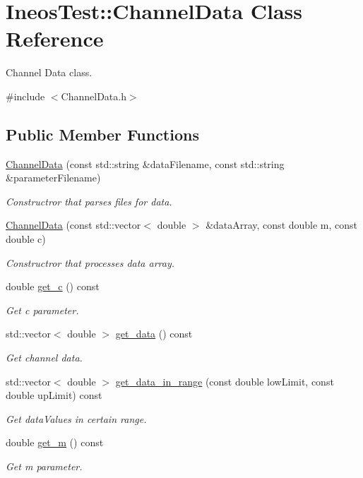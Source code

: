 \hypertarget{classIneosTest_1_1ChannelData}{\section{Ineos\-Test\-:\-:Channel\-Data Class Reference}
\label{classIneosTest_1_1ChannelData}
}


Channel Data class.  




{\ttfamily \#include $<$Channel\-Data.\-h$>$}

\subsection*{Public Member Functions}
\begin{DoxyCompactItemize}
\item 
\hyperlink{classIneosTest_1_1ChannelData_a78cbf79f506c2da567f22b37d22e6b26}{Channel\-Data} (const std\-::string \&data\-Filename, const std\-::string \&parameter\-Filename)
\begin{DoxyCompactList}\small\item\em Constructror that parses files for data. \end{DoxyCompactList}\item 
\hyperlink{classIneosTest_1_1ChannelData_a896dba77cb37e2208a67610bb2a828ba}{Channel\-Data} (const std\-::vector$<$ double $>$ \&data\-Array, const double m, const double c)
\begin{DoxyCompactList}\small\item\em Constructror that processes data array. \end{DoxyCompactList}\item 
double \hyperlink{classIneosTest_1_1ChannelData_a1345a162209296f0e9c299161dd0299c}{get\-\_\-c} () const 
\begin{DoxyCompactList}\small\item\em Get c parameter. \end{DoxyCompactList}\item 
std\-::vector$<$ double $>$ \hyperlink{classIneosTest_1_1ChannelData_a43434563ddf5e8b460bb1ffaa1716167}{get\-\_\-data} () const 
\begin{DoxyCompactList}\small\item\em Get channel data. \end{DoxyCompactList}\item 
std\-::vector$<$ double $>$ \hyperlink{classIneosTest_1_1ChannelData_a2560e50ec6f65570f25a23137e15bdb1}{get\-\_\-data\-\_\-in\-\_\-range} (const double low\-Limit, const double up\-Limit) const 
\begin{DoxyCompactList}\small\item\em Get data\-Values in certain range. \end{DoxyCompactList}\item 
double \hyperlink{classIneosTest_1_1ChannelData_a35e223f5eb751477877fddc76adc7686}{get\-\_\-m} () const 
\begin{DoxyCompactList}\small\item\em Get m parameter. \end{DoxyCompactList}\end{DoxyCompactItemize}
